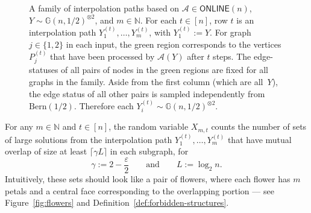 \documentclass[11pt]{article}
\theoremstyle{plain}
\theoremstyle{definition}
\theoremstyle{remark}
\newcommand{\Gnhalf}{\mathbb{G}(n,1/2)}
\newcommand{\N}{\mathbb{N}}
\newcommand{\eps}{\varepsilon}
\newcommand{\Alg}{\mathcal{A}}
\newcommand{\online}{\mathsf{ONLINE}}
\begin{document}
\begin{figure}[t!]
\caption{A family of interpolation paths based on $\Alg \in \online(n)$, $Y \sim \Gnhalf^{\otimes 2}$, and $m \in \N$. For each $t \in [n]$, row $t$ is an interpolation path $Y_1^{(t)}, \dots, Y_m^{(t)}$, with $Y_1^{(t)} := Y$. For graph $j \in \{1,2\}$ in each input, the green region corresponds to the vertices $P_j^{(t)}$ that have been processed by $\Alg(Y)$ after $t$ steps. The edge-statuses of all pairs of nodes in the green regions are fixed for all graphs in the family. Aside from the first column (which are all~$Y$), the edge status of all other pairs is sampled independently from $\mathrm{Bern}(1/2)$. Therefore each $Y_i^{(t)} \sim \Gnhalf^{\otimes 2}$.}
\label{fig:interpolation-paths}
\end{figure}

For any $m \in \N$ and $t \in [n]$, the random variable $X_{m,t}$ counts the number of sets of large solutions from the interpolation path $Y_1^{(t)}, \dots, Y_m^{(t)}$ that have mutual overlap of size at least $\lceil \gamma L\rceil$ in each subgraph, for 
\[
    \gamma := 2 - \frac \eps 2 
    \qquad 
    \text{and}
    \qquad 
    L := \log_2 n. 
\]
Intuitively, these sets should look like a pair of flowers, where each flower has $m$ petals and a central face corresponding to the overlapping portion --- see Figure~\ref{fig:flowers} and Definition~\ref{def:forbidden-structures}.
\end{document}
